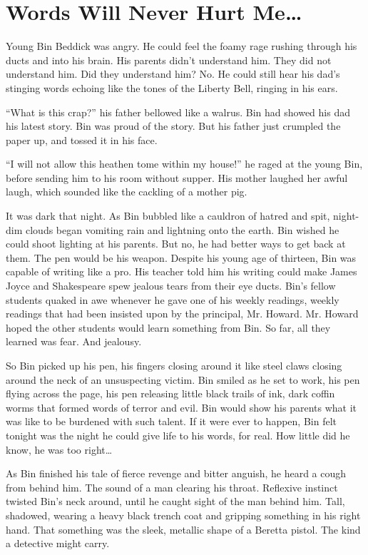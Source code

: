 \chapter{Words Will Never Hurt Me{\ldots}}





Young Bin Beddick was angry. He could feel the foamy rage rushing
through his ducts and into his brain. His parents didn't
understand him. They did not understand him. Did they understand
him? No. He could still hear his dad's stinging words echoing
like the tones of the Liberty Bell, ringing in his ears.

``What is this crap?'' his father bellowed like a walrus.
Bin had showed his dad his latest story. Bin was proud of the
story. But his father just crumpled the paper up, and tossed it in
his face.

``I will not allow this heathen tome within my house!''
he raged at the young Bin, before sending him to his room without
supper. His mother laughed her awful laugh, which sounded like the
cackling of a mother pig.

It was dark that night. As Bin bubbled like a cauldron of hatred
and spit, night-dim clouds began vomiting rain and lightning onto
the earth. Bin wished he could shoot lighting at his parents. But
no, he had better ways to get back at them. The pen would be his
weapon. Despite his young age of thirteen, Bin was capable of
writing like a pro. His teacher told him his writing could make
James Joyce and Shakespeare spew jealous tears from their eye
ducts. Bin's fellow students quaked in awe whenever he gave
one of his weekly readings, weekly readings that had been insisted
upon by the principal, Mr. Howard. Mr. Howard hoped the other
students would learn something from Bin. So far, all they learned
was fear. And jealousy.

So Bin picked up his pen, his fingers closing around it like steel
claws closing around the neck of an unsuspecting victim. Bin smiled
as he set to work, his pen flying across the page, his pen
releasing little black trails of ink, dark coffin worms that formed
words of terror and evil. Bin would show his parents what it was
like to be burdened with such talent. If it were ever to happen,
Bin felt tonight was the night he could give life to his words, for
real. How little did he know, he was too right{\ldots}

As Bin finished his tale of fierce revenge and bitter anguish, he
heard a cough from behind him. The sound of a man clearing his
throat. Reflexive instinct twisted Bin's neck around, until
he caught sight of the man behind him. Tall, shadowed, wearing a
heavy black trench coat and gripping something in his right hand.
That something was the sleek, metallic shape of a Beretta pistol.
The kind a detective might carry.

